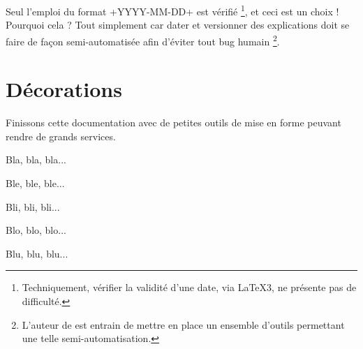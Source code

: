\begin{bdocwarn}
    Seul l'emploi du format \bdocinlatex+YYYY-MM-DD+ est vérifié
    \footnote{
        Techniquement, vérifier la validité d'une date, via \LaTeX3, ne présente pas de difficulté.
    },
    et ceci est un choix ! Pourquoi cela ? Tout simplement car dater et versionner des explications doit se faire de façon semi-automatisée afin d'éviter tout bug humain
    \footnote{
        L'auteur de  est entrain de mettre en place un ensemble d'outils permettant une telle semi-automatisation.
    }.
\end{bdocwarn}


\section{Décorations}

Finissons cette documentation avec de petites outils de mise en forme peuvant rendre de grands services.

\begin{bdoclatex}[sbs]
Bla, bla, bla...

\bdocsep %

Ble, ble, ble...

Bli, bli, bli...

\bdocxspace %

Blo, blo, blo...

Blu, blu, blu...

\end{bdoclatex}

